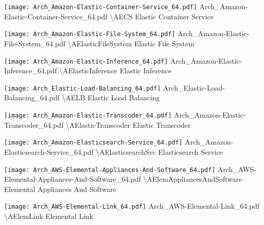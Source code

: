  {\texttt{[image: Arch\_Amazon-Elastic-Container-Service\_64.pdf]}} {Arch\_Amazon-Elastic-Container-Service\_64.pdf} {{\textbackslash}AECS} {Elastic Container Service}

 {\texttt{[image: Arch\_Amazon-Elastic-File-System\_64.pdf]}} {Arch\_Amazon-Elastic-File-System\_64.pdf} {{\textbackslash}AElasticFileSystem} {Elastic File System}

 {\texttt{[image: Arch\_Amazon-Elastic-Inference\_64.pdf]}} {Arch\_Amazon-Elastic-Inference\_64.pdf} {{\textbackslash}AElasticInference} {Elastic Inference}

 {\texttt{[image: Arch\_Elastic-Load-Balancing\_64.pdf]}} {Arch\_Elastic-Load-Balancing\_64.pdf} {{\textbackslash}AELB} {Elastic Load Balancing}

 {\texttt{[image: Arch\_Amazon-Elastic-Transcoder\_64.pdf]}} {Arch\_Amazon-Elastic-Transcoder\_64.pdf} {{\textbackslash}AElasticTranscoder} {Elastic Transcoder}

 {\texttt{[image: Arch\_Amazon-Elasticsearch-Service\_64.pdf]}} {Arch\_Amazon-Elasticsearch-Service\_64.pdf} {{\textbackslash}AElasticsearchSvc} {Elasticsearch Service}

 {\texttt{[image: Arch\_AWS-Elemental-Appliances-And-Software\_64.pdf]}} {Arch\_AWS-Elemental-Appliances-And-Software\_64.pdf} {{\textbackslash}AElemAppliancesAndSoftware} {Elemental Appliances And Software}

 {\texttt{[image: Arch\_AWS-Elemental-Link\_64.pdf]}} {Arch\_AWS-Elemental-Link\_64.pdf} {{\textbackslash}AElemLink} {Elemental Link}

